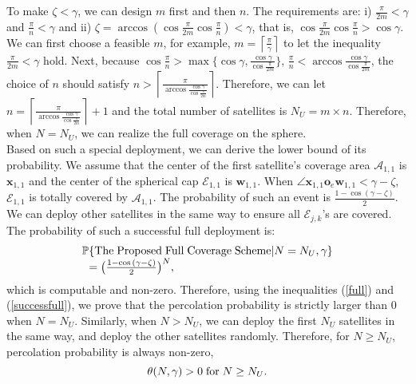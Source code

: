 \documentclass[final]{IEEEtran}
\begin{document}
\indent To make $\zeta<\gamma$, we can design $m$ first and then $n$. The requirements are: i) $\frac{\pi}{2m}<\gamma$ and $\frac{\pi}{n}<\gamma$ and ii) $\zeta = \arccos{(\cos{\frac{\pi}{2m}}\cos{\frac{\pi}{n}})}<\gamma$, that is, $\cos{\frac{\pi}{2m}}\cos{\frac{\pi}{n}}>\cos{\gamma}$. We can first choose a feasible $m$, for example, $m=\left \lceil \frac{\pi}{\gamma} \right \rceil$ to let the inequality $\frac{\pi}{2m}<\gamma$ hold. Next, because $\cos{\frac{\pi}{n}}>\max\{\cos{\gamma},\frac{\cos{\gamma}}{\cos{\frac{\pi}{2m}}}\}$,  $\frac{\pi}{n}<\arccos{\frac{\cos{\gamma}}{\cos{\frac{\pi}{2m}}}}$, the choice of $n$ should satisfy $n>\left \lceil \frac{\pi}{\arccos{\frac{\cos{\gamma}}{\cos{\frac{\pi}{2m}}}}} \right \rceil$. Therefore, we can let $n=\left \lceil \frac{\pi}{\arccos{\frac{\cos{\gamma}}{\cos{\frac{\pi}{2m}}}}} \right \rceil+1$ and the total number of satellites is $N_U=m\times n$. Therefore, when $N=N_U$, we can realize the full coverage on the sphere.\\
\indent Based on such a special deployment, we can derive the lower bound of its probability. We assume that the center of the first satellite's coverage area $\mathcal{A}_{1,1}$ is $\textbf{x}_{1,1}$ and the center of the spherical cap $\mathcal{E}_{1,1}$ is $\textbf{w}_{1,1}$. When $\angle \textbf{x}_{1,1} \textbf{o}_e \textbf{w}_{1,1}<\gamma-\zeta$, $\mathcal{E}_{1,1}$ is totally covered by $\mathcal{A}_{1,1}$. The probability of such an event is $\frac{1-\cos{(\gamma-\zeta)}}{2}$. We can deploy other satellites in the same way to ensure all $\mathcal{E}_{j,k}$'s are covered. The probability of such a successful full deployment is:
\begin{equation}
\begin{array}{r@{}l}
    \P&\{{\rm The\; Proposed\;Full\;Coverage\;Scheme}|N=N_U,\gamma\}\\
    &=\big(\frac{1-\cos{(\gamma-\zeta)}}{2}\big)^N,
\end{array}
\end{equation}
which is computable and non-zero. Therefore, using the inequalities (\ref{full}) and (\ref{successfull}), we prove that the percolation probability is strictly larger than 0 when $N=N_U$. Similarly, when $N>N_U$, we can deploy the first $N_U$ satellites in the same way, and deploy the other satellites randomly.
Therefore, for $N\geq N_U$, percolation probability is always non-zero, \ie
\begin{equation}
    \theta(N,\gamma)>0\;{\rm for}\;N\geq N_U.
\end{equation}
\end{document}
